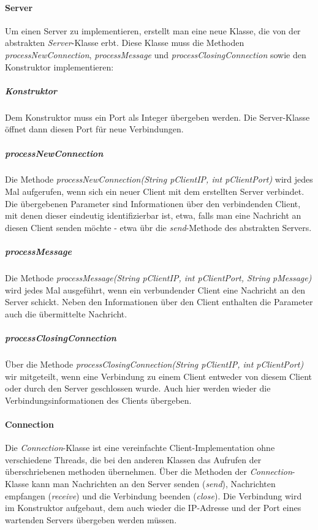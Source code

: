 \documentclass{article}
\begin{document}
	\paragraph{Server}
	Um einen Server zu implementieren, erstellt man eine neue Klasse, die von der abstrakten \textit{Server}-Klasse erbt. Diese Klasse muss die Methoden \textit{processNewConnection}, \textit{processMessage} und \textit{processClosingConnection} sowie den Konstruktor implementieren:

	\subparagraph{Konstruktor}
	Dem Konstruktor muss ein Port als Integer übergeben werden. Die Server-Klasse öffnet dann diesen Port für neue Verbindungen.

	\subparagraph{processNewConnection}
	Die Methode \textit{processNewConnection(String pClientIP, int pClientPort)} wird jedes Mal aufgerufen, wenn sich ein neuer Client mit dem erstellten Server verbindet. Die übergebenen Parameter sind Informationen über den verbindenden Client, mit denen dieser eindeutig identifizierbar ist, etwa, falls man eine Nachricht an diesen Client senden möchte - etwa übr die \textit{send}-Methode des abstrakten Servers.

	\subparagraph{processMessage}
	Die Methode \textit{processMessage(String pClientIP, int pClientPort, String pMessage)} wird jedes Mal ausgeführt, wenn ein verbundender Client eine Nachricht an den Server schickt. Neben den Informationen über den Client enthalten die Parameter auch die übermittelte Nachricht.

	\subparagraph{processClosingConnection}
	Über die Methode \textit{processClosingConnection(String pClientIP, int pClientPort)} wir mitgeteilt, wenn eine Verbindung zu einem Client entweder von diesem Client oder durch den Server geschlossen wurde. Auch hier werden wieder die Verbindungsinformationen des Clients übergeben.

	\paragraph{Connection}
	Die \textit{Connection}-Klasse ist eine vereinfachte Client-Implementation ohne verschiedene Threads, die bei den anderen Klassen das Aufrufen der überschriebenen methoden übernehmen. Über die Methoden der \textit{Connection}-Klasse kann man Nachrichten an den Server senden (\textit{send}), Nachrichten empfangen (\textit{receive}) und die Verbindung beenden (\textit{close}). Die Verbindung wird im Konstruktor aufgebaut, dem auch wieder die IP-Adresse und der Port eines wartenden Servers übergeben werden müssen.
\end{document}
